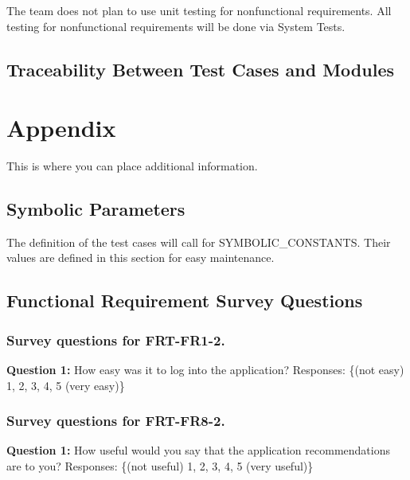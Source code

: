 \documentclass[12pt, titlepage]{article}
\begin{document}
The team does not plan to use unit testing for nonfunctional requirements. All testing for
nonfunctional requirements will be done via System Tests.

\subsection{Traceability Between Test Cases and Modules}

				




\newpage

\section{Appendix}

This is where you can place additional information.

\subsection{Symbolic Parameters}

The definition of the test cases will call for SYMBOLIC\_CONSTANTS.
Their values are defined in this section for easy maintenance.

\subsection{Functional Requirement Survey Questions}
\subsubsection{Survey questions for \textbf{FRT-FR1-2}.}

\noindent \textbf{Question 1:} How easy was it to log into the application?
Responses: \{(not easy) 1, 2, 3, 4, 5 (very easy)\} \\

\subsubsection{Survey questions for \textbf{FRT-FR8-2}.}

\noindent \textbf{Question 1:} How useful would you say that the application recommendations are to you?
Responses: \{(not useful) 1, 2, 3, 4, 5 (very useful)\} \\
\end{document}
